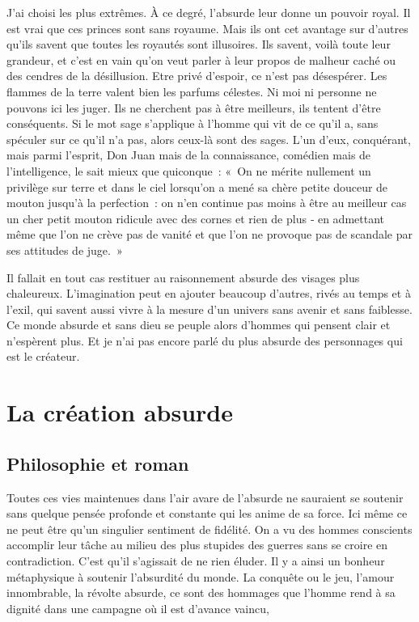 \documentclass{book}
\begin{document}
J'ai choisi les plus extrêmes. À ce degré, l'absurde leur donne un pouvoir royal. Il est vrai que ces princes sont sans royaume. Mais ils ont cet avantage sur d'autres qu'ils savent que toutes les royautés sont illusoires. Ils savent, voilà toute leur grandeur, et c'est en vain qu'on veut parler à leur propos de malheur caché ou des cendres de la désillusion. Etre privé d'espoir, ce n'est pas désespérer. Les flammes de la terre valent bien les parfums célestes. Ni moi ni personne ne pouvons ici les juger. Ils ne cherchent pas à être meilleurs, ils tentent d'être conséquents. Si le mot sage s'applique à l'homme qui vit de ce qu'il a, sans spéculer sur ce qu'il n'a pas, alors ceux-là sont des sages. L'un d'eux, conquérant, mais parmi l'esprit, Don Juan mais de la connaissance, comédien mais de l'intelligence, le sait mieux que quiconque : « On ne mérite nullement un privilège sur terre et dans le ciel lorsqu'on a mené sa chère petite douceur de mouton jusqu'à la perfection : on n'en continue pas moins à être au meilleur cas un cher petit mouton ridicule avec des cornes et rien de plus ‑ en admettant même que l'on ne crève pas de vanité et que l'on ne provoque pas de scandale par ses attitudes de juge. »

Il fallait en tout cas restituer au raisonnement absurde des visages plus chaleureux. L'imagination peut en ajouter beaucoup d'autres, rivés au temps et à l'exil, qui savent aussi vivre à la mesure d'un univers sans avenir et sans faiblesse. Ce monde absurde et sans dieu se peuple alors d'hommes qui pensent clair et n'espèrent plus. Et je n'ai pas encore parlé du plus absurde des personnages qui est le créateur.

\chapter{La création absurde}

\section{Philosophie et roman}

Toutes ces vies maintenues dans l'air avare de l'absurde ne sauraient se soutenir sans quelque pensée profonde et constante qui les anime de sa force. Ici même ce ne peut être qu'un singulier sentiment de fidélité. On a vu des hommes conscients accomplir leur tâche au milieu des plus stupides des guerres sans se croire en contradiction. C'est qu'il s'agissait de ne rien éluder. Il y a ainsi un bonheur métaphysique à soutenir l'absurdité du monde. La conquête ou le jeu, l'amour innombrable, la révolte absurde, ce sont des hommages que l'homme rend à sa dignité dans une campagne où il est d'avance vaincu,
\end{document}
